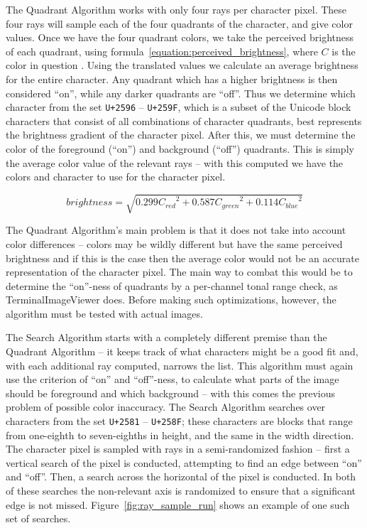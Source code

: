 \documentclass[11pt]{article}
\def\widow#1{\vskip #1\vbadness10000\penalty-200\vskip-#1}
\def\littlesection#1{
  \widow{2cm}
  \vskip 0.5cm
  \noindent{\bf #1}
  \vskip 0.0001cm
}
\begin{document}
\littlesection{Quadrant Algorithm}

The Quadrant Algorithm works with only four rays per character pixel.
These four rays will sample each of the four quadrants of the character, and give color values.
Once we have the four quadrant colors, we take the perceived brightness of each quadrant, using formula~\ref{equation:perceived_brightness}, where $C$ is the color in question \cite{finley2006hsp}.
Using the translated values we calculate an average brightness for the entire character.
Any quadrant which has a higher brightness is then considered ``on'', while any darker quadrants are ``off''.
Thus we determine which character from the set \texttt{U+2596} -- \texttt{U+259F}, which is a subset of the Unicode block characters that consist of all combinations of character quadrants, best represents the brightness gradient of the character pixel.
After this, we must determine the color of the foreground (``on'') and background (``off'') quadrants.
This is simply the average color value of the relevant rays -- with this computed we have the colors and character to use for the character pixel.

\begin{equation}
  \label{equation:perceived_brightness}
  {brightness} = \sqrt{0.299 {C_{red}}^2 + 0.587 {C_{green}}^2 + 0.114 {C_{blue}}^2}
\end{equation}

The Quadrant Algorithm's main problem is that it does not take into account color differences -- colors may be wildly different but have the same perceived brightness and if this is the case then the average color would not be an accurate representation of the character pixel.
The main way to combat this would be to determine the ``on''-ness of quadrants by a per-channel tonal range check, as TerminalImageViewer does.
Before making such optimizations, however, the algorithm must be tested with actual images.


\littlesection{Search Algorithm}

The Search Algorithm starts with a completely different premise than the Quadrant Algorithm -- it keeps track of what characters might be a good fit and, with each additional ray computed, narrows the list.
This algorithm must again use the criterion of ``on'' and ``off''-ness, to calculate what parts of the image should be foreground and which background -- with this comes the previous problem of possible color inaccuracy.
The Search Algorithm searches over characters from the set \texttt{U+2581} -- \texttt{U+258F}; these characters are blocks that range from one-eighth to seven-eighths in height, and the same in the width direction.
The character pixel is sampled with rays in a semi-randomized fashion -- first a vertical search of the pixel is conducted, attempting to find an edge between ``on'' and ``off''.
Then, a search across the horizontal of the pixel is conducted.
In both of these searches the non-relevant axis is randomized to ensure that a significant edge is not missed.
Figure~\ref{fig:ray_sample_run} shows an example of one such set of searches.
\end{document}
